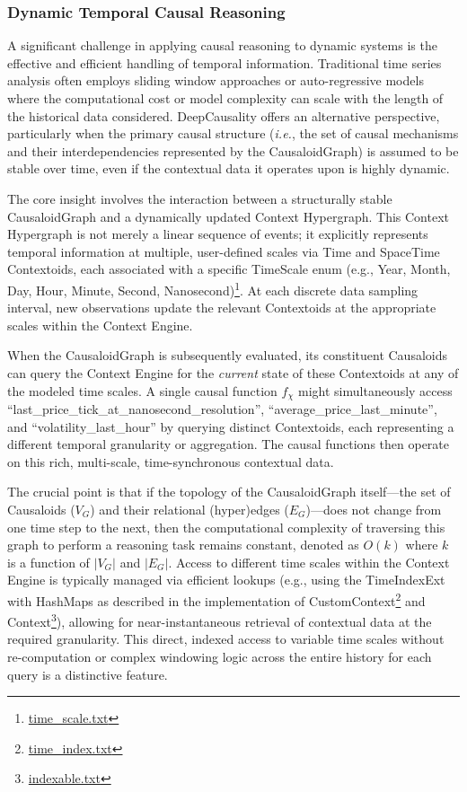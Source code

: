 \subsubsection{Dynamic Temporal Causal Reasoning}
\label{subsec:temporal_graph_reasoning}

A significant challenge in applying causal reasoning to dynamic systems is the effective and efficient handling of temporal information. Traditional time series analysis often employs sliding window approaches or auto-regressive models where the computational cost or model complexity can scale with the length of the historical data considered. DeepCausality offers an alternative perspective, particularly when the primary causal structure (\textit{i.e.}, the set of causal mechanisms and their interdependencies represented by the CausaloidGraph) is assumed to be stable over time, even if the contextual data it operates upon is highly dynamic.

The core insight involves the interaction between a structurally stable CausaloidGraph and a dynamically updated Context Hypergraph. This Context Hypergraph is not merely a linear sequence of events; it explicitly represents temporal information at multiple, user-defined scales via Time and SpaceTime Contextoids, each associated with a specific TimeScale enum (e.g., Year, Month, Day, Hour, Minute, Second, Nanosecond)\footnote{\url{time_scale.txt}}. At each discrete data sampling interval, new observations update the relevant Contextoids at the appropriate scales within the Context Engine.

When the CausaloidGraph is subsequently evaluated, its constituent Causaloids can query the Context Engine for the \textit{current} state of these Contextoids at any of the modeled time scales. A single causal function $f_\chi$ might simultaneously access ``last\_price\_tick\_at\_nanosecond\_resolution'', ``average\_price\_last\_minute'', and ``volatility\_last\_hour'' by querying distinct Contextoids, each representing a different temporal granularity or aggregation. The causal functions then operate on this rich, multi-scale, time-synchronous contextual data.

The crucial point is that if the topology of the CausaloidGraph itself---the set of Causaloids ($V_G$) and their relational (hyper)edges ($E_G$)---does not change from one time step to the next, then the computational complexity of traversing this graph to perform a reasoning task remains constant, denoted as $O(k)$ where $k$ is a function of $|V_G|$ and $|E_G|$. Access to different time scales within the Context Engine is typically managed via efficient lookups (e.g., using the TimeIndexExt with HashMaps as described in the implementation of CustomContext\footnote{\url{time_index.txt}} and Context\footnote{\url{indexable.txt}}), allowing for near-instantaneous retrieval of contextual data at the required granularity. This direct, indexed access to variable time scales without re-computation or complex windowing logic across the entire history for each query is a distinctive feature.

